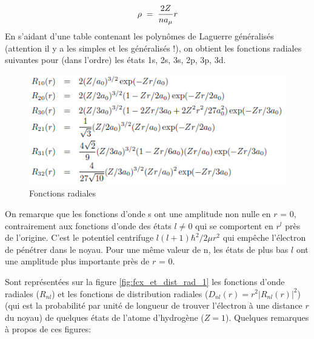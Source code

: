 \[
    \rho\; = \; \dfrac{2Z}{n a_{\mu}}r
\]
En s'aidant d'une table contenant les polynômes de Laguerre généralisés (attention il y a les simples et les généralisés !), on obtient les fonctions radiales suivantes pour (dans l'ordre) les états 1s, 2s, 3s, 2p, 3p, 3d.

\begin{figure}[tph]
    \centering
    \includegraphics{Images2/foncrad.PNG}
    \caption{Fonctions radiales}
    \label{fig:foncrad}
\end{figure}
On remarque que les fonctions d'onde s ont une amplitude non nulle en $r$ = 0, contrairement aux fonctions d'onde des états $l\neq 0$ qui se comportent en $r^l$ près de l'origine. C'est le potentiel centrifuge $l(l+1)\hbar^2/2\mu r^2$ qui empêche l'électron de pénétrer dans le noyau. Pour une même valeur de n, les états de plus bas $l$ ont une amplitude plus importante près de $r$ = 0.

Sont représentées sur la figure \ref{fig:fcx_et_dist_rad_1} les fonctions d'onde radiales ($R_{nl}$) et les fonctions de distribution radiales ($D_{nl}(r)=r^2|R_{nl}(r)|^2$) (qui est la probabilité par unité de longueur de trouver l'électron à une distance $r$ du noyau) de quelques états de l'atome d'hydrogène ($Z=1$). Quelques remarques à propos de ces figures:

